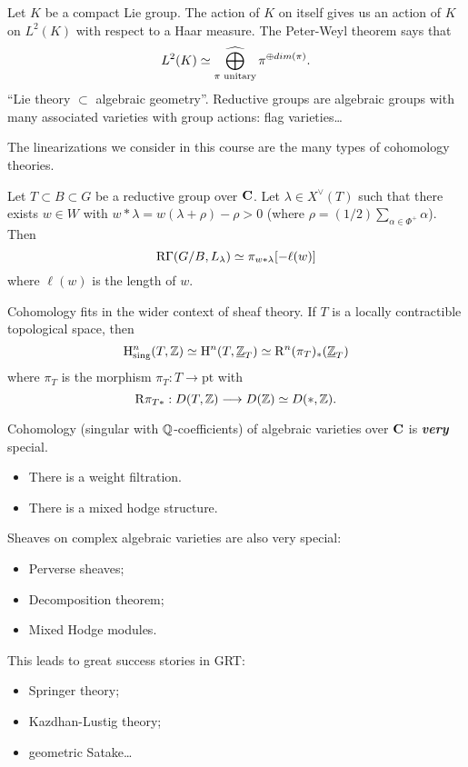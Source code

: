 \begin{example}
Let $K$ be a compact Lie group. The action of $K$ on itself gives us an action of $K$ on
$L^2(K)$ with respect to a Haar measure. The Peter-Weyl theorem says that
\[
	L^2(K) \isoto \cbigoplus_{\pi\text{ unitary}}\pi^{\oplus dim(\pi)}.
\]
``Lie theory $\subset $ algebraic geometry''. Reductive groups are algebraic groups with
many associated varieties with group actions: flag varieties\dots
\end{example}
The linearizations we consider in this course are the many types of cohomology theories.

\begin{example}
Let $T\subset B\subset G$ be a reductive group over $\mathbf{C}$. Let $\lambda\in
X^{\vee}(T)$ such that there exists $w\in W$ with $w*\lambda = w(\lambda+\rho)-\rho>0$
(where $\rho = (1 /2)\sum_{\alpha\in \Phi^{+}}\alpha$). Then
\[
	\mathrm{R}\Gamma(G /B,L_\lambda) \simeq \pi_{w*\lambda}[-\ell(w)]
\]
where $\ell(w)$ is the length of $w$.
\end{example}
Cohomology fits in the wider context of sheaf theory. If $T$ is a locally contractible
topological space, then
\[
\mathrm{H}^{n}_{\text{sing}}(T,\mathbb Z) \simeq \mathrm{H}^{n}(T,\underline{\mathbb{Z}}_T) \simeq \mathrm{R}^{n}(\pi_T)_*(\underline{\mathbb{Z}}_T)	
\]
where $\pi_T$ is the morphism $\pi_T:T\to \text{pt}$ with
\[
\RD\pi_{T*}:D(T,\Z) \to D(\Z) \isoto D(*,\Z)
.\]

Cohomology (singular with $\mathbb Q$-coefficients) of algebraic varieties over $\mathbf{C}$ is
\emph{\textbf{very}} special.
\begin{itemize}
\item There is a weight filtration.
\item There is a mixed hodge structure.
\end{itemize}
Sheaves on complex algebraic varieties are also very special:
\begin{itemize}
\item Perverse sheaves;
\item Decomposition theorem;
\item Mixed Hodge modules.
\end{itemize}
This leads to great success stories in GRT:
\begin{itemize}
\item Springer theory;
\item Kazdhan-Lustig theory;
\item geometric Satake\dots
\end{itemize}

